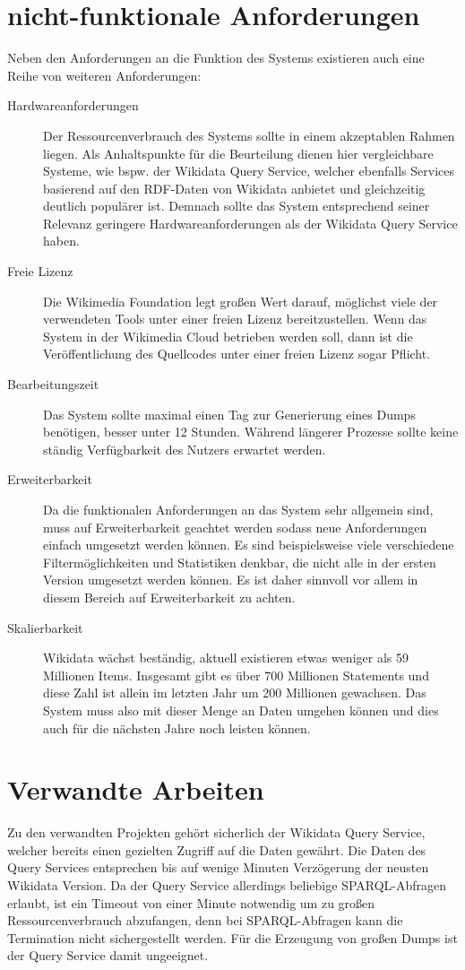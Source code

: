 \section{nicht-funktionale Anforderungen}
Neben den Anforderungen an die Funktion des Systems existieren auch eine Reihe von weiteren Anforderungen:

\begin{description}
  \item[Hardwareanforderungen] Der Ressourcenverbrauch des Systems sollte in einem akzeptablen Rahmen liegen.
  Als Anhaltspunkte für die Beurteilung dienen hier vergleichbare Systeme, wie bspw. der Wikidata Query Service, welcher ebenfalls Services basierend auf den RDF-Daten von Wikidata anbietet und gleichzeitig deutlich populärer ist. Demnach sollte das System entsprechend seiner Relevanz geringere Hardwareanforderungen als der Wikidata Query Service haben.
\item[Freie Lizenz] Die Wikimedia Foundation legt großen Wert darauf, möglichst viele der verwendeten Tools unter einer freien Lizenz bereitzustellen\cite{wikimedia-guiding-principles}.
  Wenn das System in der Wikimedia Cloud betrieben werden soll, dann ist die Veröffentlichung des Quellcodes unter einer freien Lizenz sogar Pflicht\cite{wikimedia-cloud-tos}.
\item[Bearbeitungszeit] Das System sollte maximal einen Tag zur Generierung eines Dumps benötigen, besser unter 12 Stunden. Während längerer Prozesse sollte keine ständig Verfügbarkeit des Nutzers erwartet werden. 
\item[Erweiterbarkeit] Da die funktionalen Anforderungen an das System sehr allgemein sind, muss auf Erweiterbarkeit geachtet werden sodass neue Anforderungen einfach umgesetzt werden können. Es sind beispielsweise viele verschiedene Filtermöglichkeiten und Statistiken denkbar, die nicht alle in der ersten Version umgesetzt werden können. Es ist daher sinnvoll vor allem in diesem Bereich auf Erweiterbarkeit zu achten.
\item[Skalierbarkeit] Wikidata wächst beständig, aktuell existieren etwas weniger als 59 Millionen Items.
  Insgesamt gibt es über 700 Millionen Statements und diese Zahl ist allein im letzten Jahr um 200 Millionen gewachsen. Das System muss also mit dieser Menge an Daten umgehen können und dies auch für die nächsten Jahre noch leisten können.
\end{description}

\section{Verwandte Arbeiten}
Zu den verwandten Projekten gehört sicherlich der Wikidata Query Service\cite{wd-sparql}, welcher bereits einen gezielten Zugriff auf die Daten gewährt.
Die Daten des Query Services entsprechen bis auf wenige Minuten Verzögerung der neusten Wikidata Version.
Da der Query Service allerdings beliebige SPARQL-Abfragen erlaubt, ist ein Timeout von einer Minute notwendig um zu großen Ressourcenverbrauch abzufangen, denn bei SPARQL-Abfragen kann die Termination nicht sichergestellt werden.
Für die Erzeugung von großen Dumps ist der Query Service damit ungeeignet.

